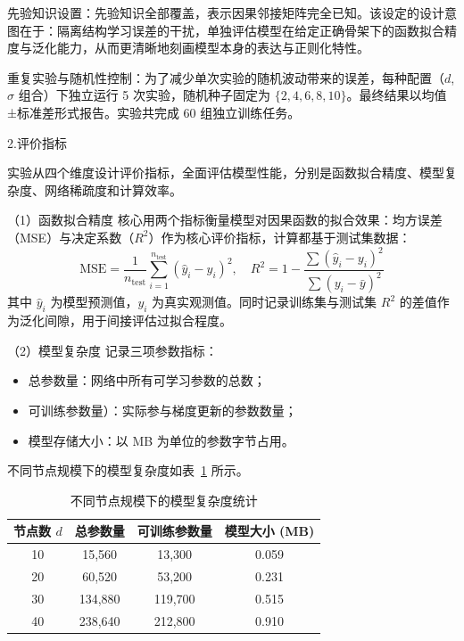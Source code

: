 先验知识设置：先验知识全部覆盖，表示因果邻接矩阵完全已知。该设定的设计意图在于：隔离结构学习误差的干扰，单独评估模型在给定正确骨架下的函数拟合精度与泛化能力，从而更清晰地刻画模型本身的表达与正则化特性。

重复实验与随机性控制：为了减少单次实验的随机波动带来的误差，每种配置（$d$, $\sigma$ 组合）下独立运行 5 次实验，随机种子固定为 $\{2, 4, 6, 8, 10\}$。最终结果以均值±标准差形式报告。实验共完成 60 组独立训练任务。

{\hei 2.评价指标}{\label{subsubsec:evaluation_metrics}}

实验从四个维度设计评价指标，全面评估模型性能，分别是函数拟合精度、模型复杂度、网络稀疏度和计算效率。


（1）函数拟合精度
核心用两个指标衡量模型对因果函数的拟合效果：均方误差（MSE）与决定系数（$R^2$）作为核心评价指标，计算都基于测试集数据：
\begin{equation}
	\text{MSE} = \frac{1}{n_{\text{test}}}\sum_{i=1}^{n_{\text{test}}}(\hat{y}_i - y_i)^2, \quad 
	R^2 = 1 - \frac{\sum(\hat{y}_i - y_i)^2}{\sum(y_i - \bar{y})^2}
\end{equation}
其中 $\hat{y}_i$ 为模型预测值，$y_i$ 为真实观测值。同时记录训练集与测试集 $R^2$ 的差值作为泛化间隙，用于间接评估过拟合程度。

（2）模型复杂度
记录三项参数指标：
\begin{itemize}
	\item 总参数量：网络中所有可学习参数的总数；
	\item 可训练参数量）：实际参与梯度更新的参数数量；
	\item 模型存储大小：以 MB 为单位的参数字节占用。
\end{itemize}
不同节点规模下的模型复杂度如表~\ref{tab:model_complexity} 所示。

\begin{table}[htbp]
	\centering
	\caption{不同节点规模下的模型复杂度统计}{\label{tab:model_complexity}}
	\begin{tabular}{cccc}
		\toprule
		节点数 $d$ & 总参数量 & 可训练参数量 & 模型大小 (MB) \\
		\midrule
		10  & 15,560  & 13,300  & 0.059 \\
		20  & 60,520  & 53,200  & 0.231 \\
		30  & 134,880 & 119,700 & 0.515 \\
		40  & 238,640 & 212,800 & 0.910 \\
		\bottomrule
	\end{tabular}
\end{table}

